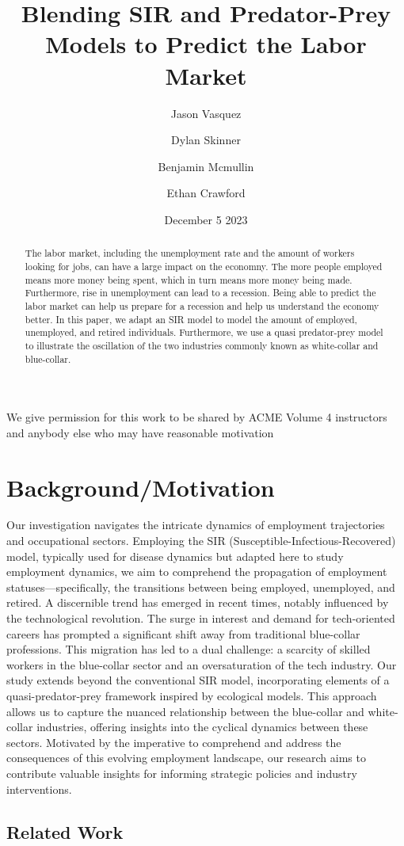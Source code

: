 \documentclass{article}
\title{Blending SIR and Predator-Prey Models to Predict the Labor Market}
\author{Jason Vasquez \and Dylan Skinner \and Benjamin Mcmullin \and Ethan Crawford}
\date{December 5 2023}
\begin{document}
\maketitle

We give permission for this work to be shared by ACME Volume 4 instructors and anybody else who may have reasonable motivation

\begin{abstract}

The labor market, including the unemployment rate and the amount of workers looking for jobs, can have a large impact on the economny.
The more people employed means more money being spent, which in turn means more money being made. 
Furthermore, rise in unemployment can lead to a recession. Being able to predict the labor market can help us prepare for a recession and help us understand the economy better.
In this paper, we adapt an SIR model to model the amount of employed, unemployed, and retired individuals.
Furthermore, we use a quasi predator-prey model to illustrate the oscillation of the two industries commonly known as white-collar and blue-collar.

\end{abstract}

\section{Background/Motivation}


Our investigation navigates the intricate dynamics of employment trajectories and occupational sectors. 
Employing the SIR (Susceptible-Infectious-Recovered) model, typically used for disease dynamics but adapted 
here to study employment dynamics, we aim to comprehend the propagation of employment statuses—specifically, 
the transitions between being employed, unemployed, and retired. A discernible trend has emerged in recent times, 
notably influenced by the technological revolution. The surge in interest and demand for tech-oriented careers 
has prompted a significant shift away from traditional blue-collar professions. This migration has led to a 
dual challenge: a scarcity of skilled workers in the blue-collar sector and an oversaturation of the tech 
industry. Our study extends beyond the conventional SIR model, incorporating elements of a quasi-predator-prey 
framework inspired by ecological models. This approach allows us to capture the nuanced relationship between 
the blue-collar and white-collar industries, offering insights into the cyclical dynamics between these sectors. 
Motivated by the imperative to comprehend and address the consequences of this evolving employment landscape, 
our research aims to contribute valuable insights for informing strategic policies and industry interventions.

\subsection{Related Work}


\end{document}
